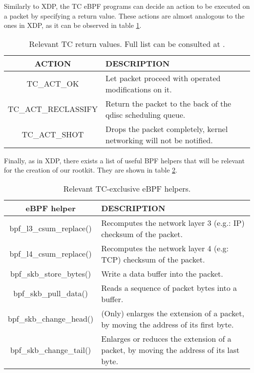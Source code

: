 Similarly to XDP, the TC eBPF programs can decide an action to be executed on a packet by specifying a return value. These actions are almost analogous to the ones in XDP, as it can be observed in table \ref{table:tc_actions}.

\begin{table}[htbp]
\begin{tabular}{|c|>{\centering\arraybackslash}p{10cm}|}
\hline
ACTION & DESCRIPTION\\
\hline
\hline
TC\_ACT\_OK & Let packet proceed with operated modifications on it.\\
\hline
TC\_ACT\_RECLASSIFY & Return the packet to the back of the qdisc scheduling queue.\\
\hline
TC\_ACT\_SHOT & Drops the packet completely, kernel networking will not be notified.\\
\hline
\end{tabular}
\caption{Relevant TC return values. Full list can be consulted at \cite{tc_ret_list_complete}.}
\label{table:tc_actions}
\end{table}

Finally, as in XDP, there exists a list of useful BPF helpers that will be relevant for the creation of our rootkit. They are shown in table \ref{table:tc_helpers}.
\begin{table}[htbp]
\begin{tabular}{|c|>{\centering\arraybackslash}p{10cm}|}
\hline
eBPF helper & DESCRIPTION\\
\hline
\hline
bpf\_l3\_csum\_replace() & Recomputes the network layer 3 (e.g.: IP) checksum of the packet.\\
\hline
bpf\_l4\_csum\_replace() & Recomputes the network layer 4 (e.g: TCP) checksum of the packet.\\
\hline
bpf\_skb\_store\_bytes() & Write a data buffer into the packet.\\
\hline
bpf\_skb\_pull\_data() & Reads a sequence of packet bytes into a buffer.\\
\hline
bpf\_skb\_change\_head() & (Only) enlarges the extension of a packet, by moving the address of its first byte.\\
\hline
bpf\_skb\_change\_tail() & Enlarges or reduces the extension of a packet, by moving the address of its last byte.\\
\hline
\hline
\end{tabular}
\caption{Relevant TC-exclusive eBPF helpers.}
\label{table:tc_helpers}
\end{table}


